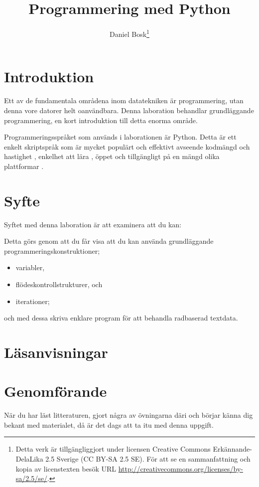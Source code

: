 \documentclass[a4paper]{miunasgn}
\title{Programmering med Python}
\author{
  Daniel Bosk\footnote{%
    Detta verk är tillgängliggjort under licensen Creative Commons 
    Erkännande-DelaLika 2.5 Sverige (CC BY-SA 2.5 SE).
    För att se en sammanfattning och kopia av licenstexten besök URL 
    \url{http://creativecommons.org/licenses/by-sa/2.5/se/}.
  }
}
\date{\svnId}
\begin{document}
\maketitle
\thispagestyle{foot}
\tableofcontents

\section{Introduktion}
\label{sec:intro}
Ett av de fundamentala områdena inom datatekniken är programmering, utan denna 
vore datorer helt oanvändbara.
Denna laboration behandlar grundläggan\-de programmering, en kort introduktion 
till detta enorma område.

Programmeringsspråket som används i laborationen är Python.
Detta är ett enkelt skriptspråk som är mycket populärt \cite{PythonWeb} och 
effektivt avseende kodmängd och hastighet \cite{PythonWeb,Shootout}, enkelhet 
att lära \cite{PythonWeb,grandell2006complicate}, öppet och tillgängligt på en 
mängd olika plattformar \cite{PythonWeb}.


\section{Syfte}
\label{sec:aim}
Syftet med denna laboration är att examinera att du kan:
\begin{itemize}
  
\end{itemize}
Detta görs genom att du får visa att du kan använda grundläggande 
programmeringskonstruktioner;
\begin{itemize}
  \item variabler,
  \item flödeskontrollstrukturer, och
  \item iterationer;
\end{itemize}
och med dessa skriva enklare program för att behandla radbaserad textdata.


\section{Läsanvisningar}
\label{sec:reading}



\section{Genomförande}
\label{sec:work}
När du har läst litteraturen, gjort några av övningarna däri och börjar känna 
dig bekant med materialet, då är det dags att ta itu med denna uppgift.
\end{document}

